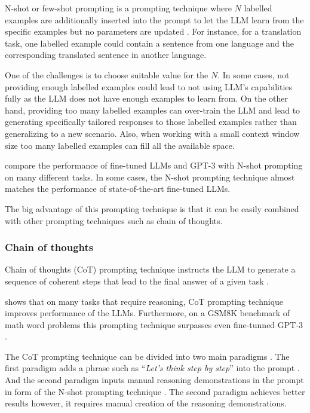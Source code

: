 N-shot or few-shot prompting is a prompting technique where $N$ labelled examples are additionally inserted into the prompt to let the LLM learn from the specific examples but no parameters are updated \cite{Brown2020}. For instance, for a translation task, one labelled example could contain a sentence from one language and the corresponding translated sentence in another language.

One of the challenges is to choose suitable value for the $N$. In some cases, not providing enough labelled examples could lead to not using LLM's capabilities fully as the LLM does not have enough examples to learn from. On the other hand, providing too many labelled examples can over-train the LLM and lead to generating specifically tailored responses to those labelled examples rather than generalizing to a new scenario. Also, when working with a small context window size too many labelled examples can fill all the available space.

\citet{Brown2020} compare the performance of fine-tuned LLMs and GPT-3 with N-shot prompting on many different tasks. In some cases, the N-shot prompting technique almost matches the performance of state-of-the-art fine-tuned LLMs.

The big advantage of this prompting technique is that it can be easily combined with other prompting techniques such as chain of thoughts.


\subsubsection{Chain of thoughts}
\label{sec:chain_of_thoughts}

Chain of thoughts (CoT) prompting technique instructs the LLM to generate a sequence of coherent steps that lead to the final answer of a given task \cite{Wei2022}.

\citet{Wei2022} shows that on many tasks that require reasoning, CoT prompting technique improves performance of the LLMs. Furthermore, on a GSM8K benchmark of math word problems this prompting technique surpasses even fine-tunned GPT-3 \cite{Wei2022}.

The CoT prompting technique can be divided into two main paradigms \cite{Zhang2022}. The first paradigm adds a phrase such as ``\textit{Let's think step by step}'' into the prompt \cite{Kojima2022}. And the second paradigm inputs manual reasoning demonstrations in the prompt in form of the N-shot prompting technique \cite{Wei2022}. 
The second paradigm achieves better results \cite{Wei2022} however, it requires manual creation of the reasoning demonstrations.

